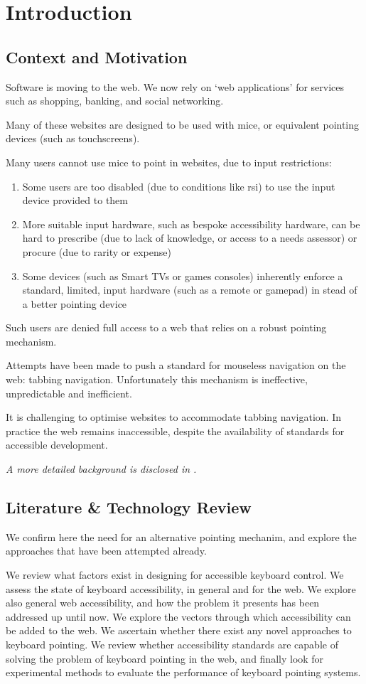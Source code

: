 \documentclass[11pt,openright,a4paper]{report}
\begin{document}
\chapter{Introduction}

\section{Context and Motivation}
Software is moving to the web. We now rely on `web applications' for services such as shopping, banking, and social networking.

Many of these websites are designed to be used with mice, or equivalent pointing devices (such as touchscreens).

Many users cannot use mice to point in websites, due to input restrictions:
\begin{enumerate}
\item Some users are too disabled (due to conditions like \gls{rsi}) to use the input device provided to them
\item More suitable input hardware, such as bespoke accessibility hardware, can be hard to prescribe (due to lack of knowledge, or access to a needs assessor) or procure (due to rarity or expense)
\item Some devices (such as Smart TVs or games consoles) inherently enforce a standard, limited, input hardware (such as a remote or gamepad) in stead of a better pointing device
\end{enumerate}

Such users are denied full access to a web that relies on a robust pointing mechanism.

Attempts have been made to push a standard for mouseless navigation on the web: tabbing navigation. Unfortunately this mechanism is ineffective, unpredictable and inefficient.

It is challenging to optimise websites to accommodate tabbing navigation. In practice the web remains inaccessible, despite the availability of standards for accessible development.

\textit{A more detailed background is disclosed in .}
\section{Literature \& Technology Review}
We confirm here the need for an alternative pointing mechanim, and explore the approaches that have been attempted already.

We review what factors exist in designing for accessible keyboard control. We assess the state of keyboard accessibility, in general and for the web. We explore also general web accessibility, and how the problem it presents has been addressed up until now. We explore the vectors through which accessibility can be added to the web. We ascertain whether there exist any novel approaches to keyboard pointing. We review whether accessibility standards are capable of solving the problem of keyboard pointing in the web, and finally look for experimental methods to evaluate the performance of keyboard pointing systems.
\end{document}
